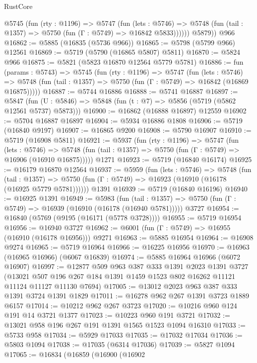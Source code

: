 \begin{lexlean}{RustCore}
\begin{coremodule}
          @5745
            (fun (rty : @1196) =>
            @5747
              (fun (lets : @5746) =>
              @5748 (fun (tail : @1357) => @5750 (fun (Γ : @5749) => @16842 @5833))))))
        @5879))
    @966
@16862 := @5885 (@16835 (@5736 @966))
@16865 := @5798 (@5799 @966) @12561
@16869 := @5719 (@5790 (@16865 @5807) @5811)
@16870 := @5824 @966
@16875 := @5821 (@5823 @16870 @12564 @5779 @5781)
@16886 := fun (params : @5743) =>
  @5745
    (fun (rty : @1196) =>
    @5747
      (fun (lets : @5746) =>
      @5748 (fun (tail : @1357) => @5750 (fun (Γ : @5749) => @16842 (@16869 @16875)))))
@16887 := @5744 @16886
@16888 := @5741 @16887
@16897 := @5847
    (fun (U : @5846) => @5848 (fun (t : @7) => @5856 (@5719 (@5862 @12561 @5737) @5873)))
@16900 := @16862 (@16888 @16897) @12559
@16902 := @5704 @16887 @16897
@16904 := @5934 @16886 @1808
@16906 := @5719 (@16840 @9197)
@16907 := @16865 @9200
@16908 := @5790 @16907
@16910 := @5719 (@16908 @5811)
@16921 := @5937
    (fun (rty : @1196) =>
    @5747
      (fun (lets : @5746) =>
      @5748 (fun (tail : @1357) => @5750 (fun (Γ : @5749) => @16906 (@16910 @16875)))))
    @1271
@16923 := @5719 (@16840 @16174)
@16925 := @16179 @16870 @12564
@16937 := @5959
    (fun (lets : @5746) =>
    @5748
      (fun (tail : @1357) =>
      @5750 (fun (Γ : @5749) => @16923 (@16910 (@16178 (@16925 @5779 @5781))))))
    @1391
@16939 := @5719 (@16840 @16196)
@16940 := @16925 @1391
@16949 := @5983
    (fun (tail : @1357) => @5750 (fun (Γ : @5749) => @16939 (@16910 (@16178 (@16940 @5781)))))
    @3727
@16954 := @16840 (@5769 (@9195 (@16171 (@5778 @3728))))
@16955 := @5719 @16954
@16956 := @16940 @3727
@16962 := @6001 (fun (Γ : @5749) => @16955 (@16910 (@16178 @16956))) @9271
@16963 := @5885 @16954
@16964 := @16908 @9274
@16965 := @5719 @16964
@16966 := @16225 @16956
@16970 := @16963 (@16965 @16966) (@6067 @16839)
@16974 := @5885 @16964 @16966 (@6072 @16907)
@16997 := @12877
    @509
    @963
    @387
    @333
    @1391
    @2023
    @1391
    @3727
    (@13021 @507 @196 @267 @184 @1391 @1459 @1523 @802 @16262 @11121 @11124 @11127 @11130 @7694)
@17005 := @13012 @2023 @963 @387 @333 @1391 @3724 @1391 @1829
@17011 := @16278 @962 @267 @1391 @3723 @1889 @6157
@17014 := @10212 @962 @267 @3723
@17020 := @10216 @960 @124 @191 @14 @3721 @1377
@17023 := @10223 @960 @191 @3721
@17032 := @13021 @958 @196 @267 @191 @1391 @1565 @1523 @1094 @16310
@17033 := @5733 @958
@17034 := @5929 @17033
@17035 := @17032 @17034
@17036 := @5803 @1094
@17038 := @17035 (@6314 @17036)
@17039 := @5827 @1094
@17065 := @16834
    (@16859
      (@16900
        (@16902

\end{coremodule}
\end{lexlean}
